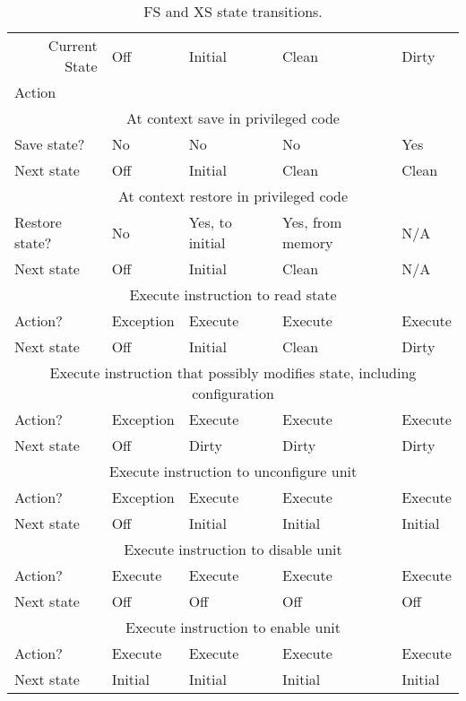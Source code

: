 \begin{table*}[h!]
\begin{center}
\begin{tabular}{|l|l|l|l|l|}
\hline
\multicolumn{1}{|r|}{Current State} & Off & Initial & Clean & Dirty \\
Action & & & &\\
\hline
\hline
\multicolumn{5}{|c|}{At context save in privileged code}\\
\hline
Save state?    & No         & No        & No     & Yes \\
Next state       & Off        & Initial   & Clean  & Clean \\
\hline
\hline
\multicolumn{5}{|c|}{At context restore in privileged code}\\
\hline
Restore state? & No        & Yes, to initial & Yes, from memory   & N/A \\
Next state     & Off       & Initial   & Clean  & N/A \\
\hline
\hline
\multicolumn{5}{|c|}{Execute instruction to read state}\\
\hline
Action?        & Exception & Execute   & Execute & Execute \\
Next state     & Off       & Initial   & Clean  & Dirty \\
\hline
\hline
\multicolumn{5}{|c|}{Execute instruction that possibly modifies state, including configuration}\\
\hline
Action?        & Exception & Execute & Execute & Execute \\
Next state     & Off       & Dirty   & Dirty  & Dirty \\
\hline
\hline
\multicolumn{5}{|c|}{Execute instruction to unconfigure unit}\\
\hline
Action?        & Exception & Execute & Execute & Execute \\
Next state     & Off       & Initial & Initial & Initial \\
\hline
\hline
\multicolumn{5}{|c|}{Execute instruction to disable unit}\\
\hline
Action?        & Execute   & Execute & Execute & Execute \\
Next state     & Off       & Off     & Off     & Off \\
\hline
\hline
\multicolumn{5}{|c|}{Execute instruction to enable unit}\\
\hline
Action?        & Execute   & Execute & Execute & Execute \\
Next state     & Initial   & Initial & Initial & Initial   \\
\hline
\end{tabular}
\end{center}
\caption{FS and XS state transitions.}
\label{fsxsstates}
\end{table*}

